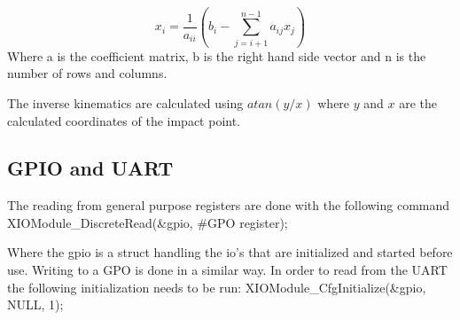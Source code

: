 \begin{equation}
	x_i = \frac{1}{a_{ii}} (b_i - \sum_{j=i+1}^{n-1} a_{ij}x_j)
\end{equation}
Where a is the coefficient matrix, b is the right hand side vector and n is the number of rows and columns.

The inverse kinematics are calculated using $atan(y/x)$ where $y$ and $x$ are the calculated coordinates of the impact point. 

\subsection{GPIO and UART}
The reading from general purpose registers are done with the following command 
XIOModule_DiscreteRead(&gpio, #GPO register);

Where the gpio is a struct handling the io's that are initialized and started before use.
Writing to a GPO is done in a similar way.
In order to read from the UART the following initialization needs to be run:
XIOModule_CfgInitialize(&gpio, NULL, 1);